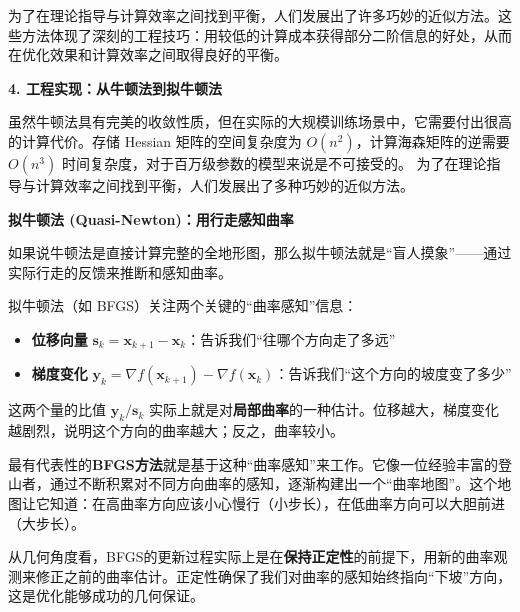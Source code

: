 
为了在理论指导与计算效率之间找到平衡，人们发展出了许多巧妙的近似方法。这些方法体现了深刻的工程技巧：用较低的计算成本获得部分二阶信息的好处，从而在优化效果和计算效率之间取得良好的平衡。

\textbf{4. 工程实现：从牛顿法到拟牛顿法}

虽然牛顿法具有完美的收敛性质，但在实际的大规模训练场景中，它需要付出很高的计算代价。存储 Hessian 矩阵的空间复杂度为 $O(n^2)$，计算海森矩阵的逆需要 $O(n^3)$ 时间复杂度，对于百万级参数的模型来说是不可接受的。
为了在理论指导与计算效率之间找到平衡，人们发展出了多种巧妙的近似方法。

\textbf{拟牛顿法 (Quasi-Newton)：用行走感知曲率}

如果说牛顿法是直接计算完整的全地形图，那么拟牛顿法就是“盲人摸象”——通过实际行走的反馈来推断和感知曲率。

拟牛顿法（如 BFGS）关注两个关键的``曲率感知''信息：
\begin{itemize}
\item \textbf{位移向量 }$\mathbf{s}_k = \mathbf{x}_{k+1} - \mathbf{x}_k$：告诉我们``往哪个方向走了多远''
\item \textbf{梯度变化 }$\mathbf{y}_k = \nabla f(\mathbf{x}_{k+1}) - \nabla f(\mathbf{x}_k)$：告诉我们``这个方向的坡度变了多少''
\end{itemize}
这两个量的比值 $\mathbf{y}_k/\mathbf{s}_k$ 
实际上就是对\textbf{局部曲率}的一种估计。位移越大，梯度变化越剧烈，说明这个方向的曲率越大；反之，曲率较小。

最有代表性的\textbf{BFGS方法}就是基于这种``曲率感知''来工作。它像一位经验丰富的登山者，通过不断积累对不同方向曲率的感知，逐渐构建出一个``曲率地图''。这个地图让它知道：在高曲率方向应该小心慢行（小步长），在低曲率方向可以大胆前进（大步长）。

从几何角度看，BFGS的更新过程实际上是在\textbf{保持正定性}的前提下，用新的曲率观测来修正之前的曲率估计。正定性确保了我们对曲率的感知始终指向``下坡''方向，这是优化能够成功的几何保证。

